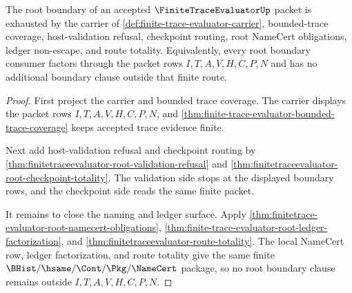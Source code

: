 \begin{theorem}
\label{thm:finite-trace-evaluator-root-boundary-completion}
The root boundary of an accepted $\FiniteTraceEvaluatorUp$ packet is exhausted
by the carrier of \autoref{def:finite-trace-evaluator-carrier}, bounded-trace
coverage, host-validation refusal, checkpoint routing, root NameCert
obligations, ledger non-escape, and route totality. Equivalently, every root
boundary consumer factors through the packet rows $I,T,A,V,H,C,P,N$ and has no
additional boundary clause outside that finite route.
\end{theorem}
\begin{proof}
First project the carrier and bounded trace coverage. The carrier displays the
packet rows $I,T,A,V,H,C,P,N$, and
\autoref{thm:finite-trace-evaluator-bounded-trace-coverage} keeps accepted
trace evidence finite.

Next add host-validation refusal and checkpoint routing by
\autoref{thm:finitetraceevaluator-root-validation-refusal} and
\autoref{thm:finitetraceevaluator-root-checkpoint-totality}. The validation
side stops at the displayed boundary rows, and the checkpoint side reads the
same finite packet.

It remains to close the naming and ledger surface. Apply
\autoref{thm:finitetrace-evaluator-root-namecert-obligations},
\autoref{thm:finite-trace-evaluator-root-ledger-factorization}, and
\autoref{thm:finitetraceevaluator-route-totality}. The local NameCert row,
ledger factorization, and route totality give the same finite
$\BHist/\hsame/\Cont/\Pkg/\NameCert$ package, so no root boundary clause
remains outside $I,T,A,V,H,C,P,N$.
\end{proof}


